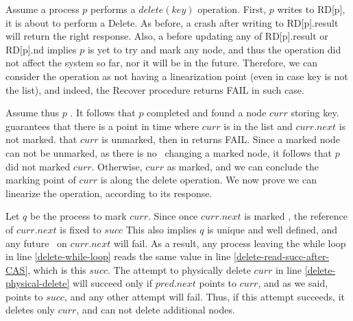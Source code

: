 {Assume a process $p$ performs a $delete(key)$ operation. First, $p$ writes to RD[p], 
 it is about to perform a Delete. As before, a crash after writing to RD[p].result 
will return the right response. Also, a  before updating any of RD[p].result 
or RD[p].nd implies $p$ is yet to try and mark any node, 
and thus the operation did not affect the system so far, 
nor it will be in the future. Therefore, we can consider the operation 
as not having a linearization point (even in case key is not the list), 
and indeed, the Recover procedure returns FAIL in such case.

Assume thus $p$ . 
It follows that $p$ completed \y{\search\ } 
and found a node $curr$ storing key. \y{\search\ } guarantees  that there is a point 
in time  where $curr$ is in the list and $curr.next$ is not marked. 
 that $curr$ is unmarked, then in returns FAIL. 
Since a marked node can not be unmarked, as there is no \CAS\ changing a marked node, 
it follows that $p$ did not marked $curr$. 
Otherwise,  $curr$ as marked, and we can conclude 
the marking point of $curr$ is along the delete operation. We now prove 
we can linearize the operation, according to its response.

Let $q$ be the process to mark $curr$. Since once $curr.next$ is marked , 
the reference of $curr.next$ is fixed to $succ$ 
This also implies $q$ is unique and well defined, and any future \CAS\ on $curr.next$ will fail. 
As a result, any process leaving the while loop in line \ref{delete-while-loop} reads the same value 
in line \ref{delete-read-succ-after-CAS}, which is this $succ$. The attempt to physically delete $curr$ 
in line \ref{delete-physical-delete} will succeed only if $pred.next$ points to $curr$, 
and as we said,  points to $succ$, and any other attempt will fail. 
Thus, if this attempt succeeds, it deletes only $curr$, and can not delete additional nodes.

}
